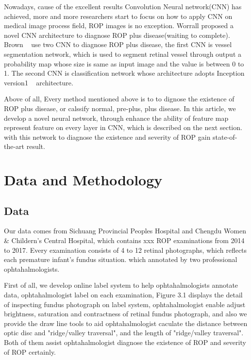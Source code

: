 \documentclass[10pt,twocolumn,letterpaper]{article}
\begin{document}
  Nowadays, cause of the excellent results Convolution Neural network(CNN) has achieved, more and more researchers start to focus on how to apply CNN on medical image process field, ROP images is no exception. Worrall \etal proposed a novel CNN architecture to diagnose ROP plus disease(waiting to complete). Brown \etal ~\cite{} use two CNN to diagnose ROP plus disease, the first CNN is vessel segmentation network, which is used to segment retinal vessel through output a probability map whose size is same as input image and the value is between 0 to 1. The second CNN is classification network whose architecture adopts Inception version1 ~\cite{} architecture.

  Above of all,
  Every method mentioned above is to to dignose the existence of ROP plus disease, or calssify normal, pre-plus, plus
  disease. In this article, we develop a novel neural network, through enhance the ability of feature map represent feature on every layer in CNN, which is described on the next section. with this network to diagnose the existence and severity of ROP gain state-of-the-art result.

\section{Data and Methodology}
\subsection{Data}
	Our data comes from Sichuang Provincial Peoples Hospital and Chengdu Women \& Childern's Central Hospital, which contains xxx ROP examinations from 2014 to 2017. Every examination consists of 4 to 12 retinal photographs, which reflects each premature infant's fundus situation.
  which annotated by two professional ophtahalmologists.

  First of all, we develop online label system to help ophtahalmologists annotate data, ophtahalmologist label on each examination, Figure 3.1 displays the detail of inspecting fundus photograph on label system, ophtahalmologist enable adjust brightness, saturation and contractness of retinal fundus photograph, and also we provide the draw line tools to aid ophtahalmologist caculate the distance between optic disc and "ridge/valley traversal", and the length of "ridge/valley traversal". Both of them assist ophtahalmologist diagnose the existence of ROP and severity of ROP certainly.
\end{document}
